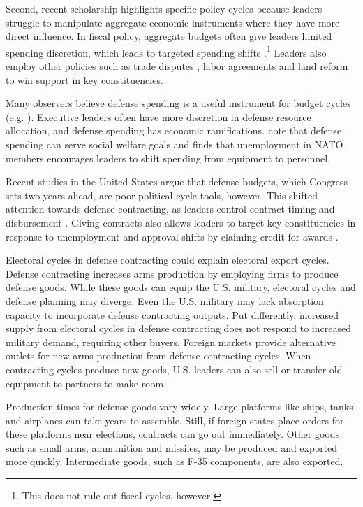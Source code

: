 \documentclass[12pt]{article}
\begin{document}
Second, recent scholarship highlights specific policy cycles because leaders struggle to manipulate aggregate economic instruments where they have more direct influence. 
In fiscal policy, aggregate budgets often give leaders limited spending discretion, which leads to targeted spending shifts \citep[pg. 248]{Dubois2016}.\footnote{This does not rule out fiscal cycles, however.} 
Leaders also employ other policies such as trade disputes \citep{Conconietal2017}, labor agreements \citep{Ahlquist2010} and land reform \cite{Philips2020} to win support in key constituencies.


Many observers believe defense spending is a useful instrument for budget cycles (e.g. \cite{Tufte1978, Mintz1988}).
Executive leaders often have more discretion in defense resource allocation, and defense spending has economic ramifications.
\citet{WhittenWilliams2011} note that defense spending can serve social welfare goals and \citet{Becker2021} finds that unemployment in NATO members encourages leaders to shift spending from equipment to personnel.


Recent studies in the United States argue that defense budgets, which Congress sets two years ahead, are poor political cycle tools, however.
This shifted attention towards defense contracting, as leaders control contract timing and disbursement \citep{Mayer1995, DerouenHeo2000}.
Giving contracts also allows leaders to target key constituencies in response to unemployment and approval shifts by claiming credit for awards \citep{DerouenHeo2000}. 


Electoral cycles in defense contracting could explain electoral export cycles.
Defense contracting increases arms production by employing firms to produce defense goods. 
While these goods can equip the U.S. military, electoral cycles and defense planning may diverge.
Even the U.S. military may lack absorption capacity to incorporate defense contracting outputs.
Put differently, increased supply from electoral cycles in defense contracting does not respond to increased military demand, requiring other buyers. 
Foreign markets provide alternative outlets for new arms production from defense contracting cycles. 
When contracting cycles produce new goods, U.S. leaders can also sell or transfer old equipment to partners to make room.


Production times for defense goods vary widely.
Large platforms like ships, tanks and airplanes can take years to assemble. 
Still, if foreign states place orders for these platforms near elections, contracts can go out immediately.
Other goods such as small arms, ammunition and missiles, may be produced and exported more quickly. 
Intermediate goods, such as F-35 components, are also exported. 
\end{document}
